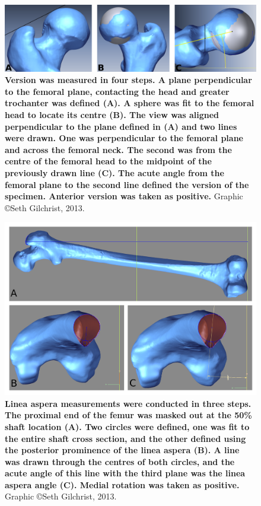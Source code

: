 \begin{figure}
\centering
\includegraphics[width=\linewidth]{./appendixVersion/figures/version}
\caption[Digital version measurement]{
\textbf{Version was measured in four steps. A plane perpendicular to the femoral plane, contacting the head and greater trochanter was defined (A). A sphere was fit to the femoral head to locate its centre (B). The view was aligned perpendicular to the plane defined in (A) and two lines were drawn. One was perpendicular to the femoral plane and across the femoral neck. The second was from the centre of the femoral head to the midpoint of the previously drawn line (C). The acute angle from the femoral plane to the second line defined the version of the specimen. Anterior version was taken as positive.} Graphic \copyright Seth Gilchrist, 2013.}
\label{fig:version_version}
\end{figure}

\begin{figure}
\centering
\includegraphics[width=0.7\linewidth]{./appendixVersion/figures/la}
\caption[Digital linae aspera measurement]{
\textbf{Linea aspera measurements were conducted in three steps. The proximal end of the femur was masked out at the 50\% shaft location (A). Two circles were defined, one was fit to the entire shaft cross section, and the other defined using the posterior prominence of the linea aspera (B). A line was drawn through the centres of both circles, and the acute angle of this line with the third plane was the linea aspera angle (C). Medial rotation was taken as positive.} Graphic \copyright Seth Gilchrist, 2013.}
\label{fig:version_la}
\end{figure}

